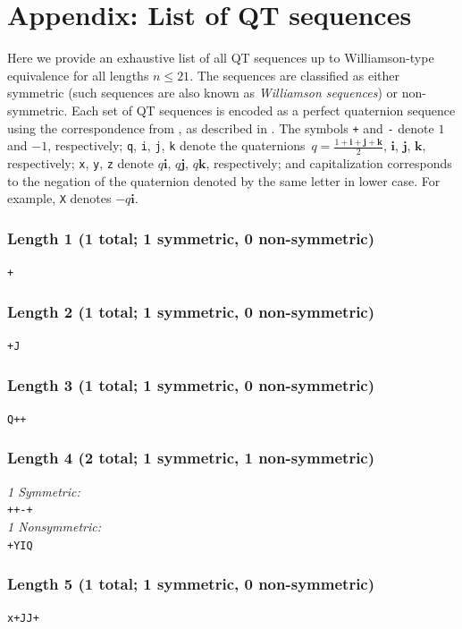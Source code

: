 \documentclass[12pt]{article}
\numberwithin{equation}{section}
\newcommand{\qi}{\mathbf{i}}
\newcommand{\qj}{\mathbf{j}}
\newcommand{\qk}{\mathbf{k}}
\begin{document}



\section*{Appendix: List of QT sequences}
\label{sec-qt-sequences}

Here we provide an exhaustive list of all QT sequences up to Williamson-type equivalence
for all lengths $n\leq21$.  The sequences are classified as either symmetric (such sequences
are also known as \emph{Williamson sequences}) or non-symmetric.
Each set of QT sequences is encoded as a
perfect quaternion sequence using the correspondence from , as described in .
The symbols \texttt{+} and \texttt{-} denote $1$ and $-1$, respectively; \texttt{q}, \texttt{i}, \texttt{j}, \texttt{k} denote the quaternions~$q=\frac{1+\qi+\qj+\qk}{2}$, $\qi$, $\qj$, $\qk$, respectively;
\texttt{x}, \texttt{y}, \texttt{z} denote $q\qi$, $q\qj$, $q\qk$, respectively;
and capitalization corresponds to the negation of the quaternion denoted by the same letter in lower case. For example, \texttt{X} denotes $-q\qi$.

\subsubsection*{Length 1 (1 total; 1 symmetric, 0 non-symmetric)}
\raggedright
\verb|+|
\subsubsection*{Length 2 (1 total; 1 symmetric, 0 non-symmetric)}
\raggedright
\verb|+J|
\subsubsection*{Length 3 (1 total; 1 symmetric, 0 non-symmetric)}
\raggedright
\verb|Q++|
\subsubsection*{Length 4 (2 total; 1 symmetric, 1 non-symmetric)}
\raggedright
\emph{1 Symmetric:}\\
\verb|++-+|
\\[0.5\baselineskip]
\emph{1 Nonsymmetric:}\\
\verb|+YIQ|\\
\subsubsection*{Length 5 (1 total; 1 symmetric, 0 non-symmetric)}
\raggedright
\verb|x+JJ+|
\end{document}
